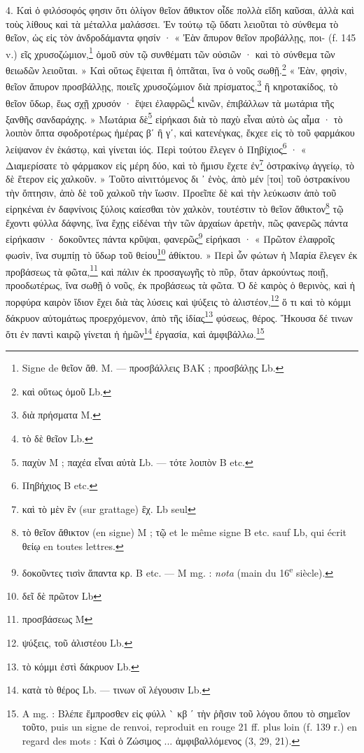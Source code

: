 \documentclass[a4paper, 11pt, oneside, polutonikogreek, french]{article}
\begin{document}
4. Καὶ ὁ φιλόσοφός φησιν ὅτι ὀλίγον θεῖον ἄθικτον οἶδε πολλὰ εἴδη καῦσαι, ἀλλὰ καὶ τοὺς λίθους καὶ τὰ μέταλλα μαλάσσει. Ἐν τούτῳ τῷ ὕδατι λειοῦται τὸ σύνθεμα τὸ θεῖον, ὡς εἰς τὸν ἀνδροδάμαντα φησίν · « Ἐὰν ἄπυρον θεῖον προβάλλῃς, ποι- (f. 145 v.) εῖς χρυσοζώμιον,\footnote{Signe de θεῖον ἄθ. M. --- προσβάλλεις BAK ; προσβάλῃς Lb.} ὁμοῦ σὺν τῷ συνθέματι τῶν οὐσιῶν · καὶ τὸ σύνθεμα τῶν θειωδῶν λειοῦται. » Καὶ οὕτως ἕψειται ἢ ὀπτᾶται, ἵνα ὁ νοῦς σωθῇ.\footnote{καὶ οὕτως ὁμοῦ Lb.} « Ἐὰν, φησὶν, θεῖον ἄπυρον προσβάλλῃς, ποιεῖς χρυσοζώμιον διὰ πρίσματος,\footnote{διὰ πρήσματα M.} ἢ κηροτακίδος, τὸ θεῖον ὕδωρ, ἕως σχῇ χρυσόν · ἕψει ἐλαφρῶς\footnote{τὸ δὲ θεῖον Lb.} κινῶν, ἐπιβάλλων τὰ μωτάρια τῆς ξανθῆς σανδαράχης. » Μωτάρια δὲ\footnote{παχὺν M ; παχέα εἶναι αὐτὰ Lb. --- τότε λοιπὸν B etc.} εἰρήκασι διὰ τὸ παχὺ εἶναι αὐτὸ ὡς αἷμα · τὸ λοιπὸν ὄπτα σφοδροτέρως ἡμέρας βʹ ἢ γʹ, καὶ κατενέγκας, ἔκχεε εἰς τὸ τοῦ φαρμάκου λείψανον ἐν ἑκάστῳ, καὶ γίνεται ἰός. Περὶ τούτου ἔλεγεν ὁ Πηβίχιος\footnote{Πηβήχιος B etc.} · « Διαμερίσατε τὸ φάρμακον εἰς μέρη δύο, καὶ τὸ ἤμισυ ἔχετε ἐν\footnote{καὶ τὸ μὲν ἓν (sur grattage) ἒχ. Lb seul} ὀστρακίνῳ ἀγγείῳ, τὸ δὲ ἕτερον εἰς χαλκοῦν. » Τοῦτο αἰνιττόμενος δι ᾽ ἑνὸς, ἀπὸ μέν [τοι] τοῦ ὀστρακίνου τὴν ὄπτησιν, ἀπὸ δὲ τοῦ χαλκοῦ τὴν ἴωσιν. Προεῖπε δὲ καὶ τὴν λεύκωσιν ἀπὸ τοῦ εἰρηκέναι ἐν δαφνίνοις ξύλοις καίεσθαι τὸν χαλκὸν, τουτέστιν τὸ θεῖον ἄθικτον\footnote{τὸ θεῖον ἄθικτον (en signe) M ; τῷ et le même signe B etc. sauf Lb, qui écrit θείῳ en toutes lettres.} τῷ ἔχοντι φύλλα δάφνης, ἵνα ἔχῃς εἰδέναι τὴν τῶν ἀρχαίων ἀρετὴν, πῶς φανερῶς πάντα εἰρήκασιν · δοκοῦντες πάντα κρῦψαι, φανερῶς\footnote{δοκοῦντες τισὶν ἅπαντα κρ. B etc. --- M mg. : \emph{nota} (main du 16\textsuperscript{e} siècle).} εἰρήκασι · « Πρῶτον ἐλαφροῖς φωσὶν, ἵνα συμπίῃ τὸ ὕδωρ τοῦ θείου\footnote{δεῖ δὲ πρῶτον Lb} ἀθίκτου. » Περὶ ὧν φώτων ἡ Μαρία ἔλεγεν ἐκ προβάσεως τὰ φῶτα,\footnote{προσβάσεως M} καὶ πάλιν ἐκ προσαγωγῆς τὸ πῦρ, ὅταν ἀρκούντως ποιῇ, προοδωτέρως, ἵνα σωθῇ ὁ νοῦς, ἐκ προβάσεως τὰ φῶτα. Ὁ δὲ καιρὸς ὁ θερινὸς, καὶ ἡ πορφύρα καιρὸν ἴδιον ἔχει διὰ τὰς λύσεις καὶ ψύξεις τὸ ἁλιστέον,\footnote{ψύξεις, τοῦ ἁλιστέου Lb.} ὅ τι καὶ τὸ κόμμι δάκρυον αὐτομάτως προερχόμενον, ἀπὸ τῆς ἰδίας\footnote{τὸ κόμμι ἐστὶ δάκρυον Lb.} φύσεως, θέρος. Ἤκουσα δέ τινων ὅτι ἐν παντὶ καιρῷ γίνεται ἡ ἡμῶν\footnote{κατὰ τὸ θέρος Lb. --- τινων οἳ λέγουσιν Lb.} ἐργασία, καὶ ἀμφιβάλλω.\footnote{A mg. : Βλέπε ἔμπροσθεν εἰς φύλλ ` κβ ʹ τὴν ῥῆσιν τοῦ λόγου ὅπου τὸ σημεῖον τοῦτο, puis un signe de renvoi, reproduit en rouge 21 ff. plus loin (f. 139 r.) en regard des mots : Καὶ ὁ Ζώσιμος ... ἀμφιβαλλόμενος (3, 29, 21).}
\end{document}
